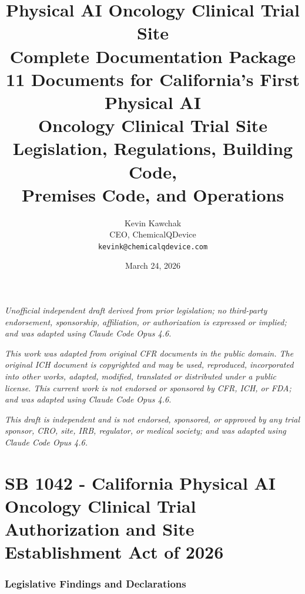 \documentclass[11pt,letterpaper]{article}
\title{%
  \textbf{Physical AI Oncology Clinical Trial Site}\\
  \textbf{Complete Documentation Package}\\[6pt]
  \large 11 Documents for California's First Physical AI\\
  Oncology Clinical Trial Site\\[6pt]
  \normalsize Legislation, Regulations, Building Code,\\
  Premises Code, and Operations
}
\author{%
  Kevin Kawchak\\
  CEO, ChemicalQDevice\\
  \texttt{kevink@chemicalqdevice.com}
}
\date{March 24, 2026}
\begin{document}
\maketitle
\thispagestyle{fancy}

\begin{center}
\footnotesize
\textit{Unofficial independent draft derived from prior legislation;
no third-party endorsement, sponsorship, affiliation, or authorization
is expressed or implied; and was adapted using Claude Code Opus 4.6.}
\end{center}

\vspace{0.5em}

\begin{center}
\footnotesize
\textit{This work was adapted from original CFR documents in the public domain.
The original ICH document is copyrighted and may be used, reproduced,
incorporated into other works, adapted, modified, translated or distributed
under a public license. This current work is not endorsed or sponsored by
CFR, ICH, or FDA; and was adapted using Claude Code Opus 4.6.}
\end{center}

\vspace{0.5em}

\begin{center}
\footnotesize
\textit{This draft is independent and is not endorsed, sponsored, or approved
by any trial sponsor, CRO, site, IRB, regulator, or medical society;
and was adapted using Claude Code Opus 4.6.}
\end{center}

\vspace{1em}
\tableofcontents
\newpage


\part{SB 1042 - California Physical AI Oncology Clinical Trial
Authorization and Site Establishment Act of 2026}

\section{Legislative Findings and Declarations}
\end{document}
